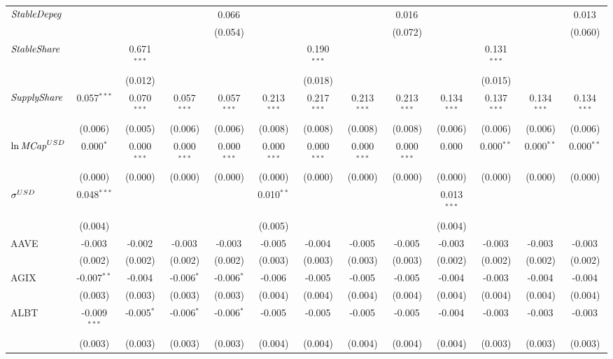 \begin{table}[!htbp]
\begin{tabular}{@{\extracolsep{5pt}}lcccccccccccc}
 ${\it StableDepeg}$ & & & & 0.066$^{}$ & & & & 0.016$^{}$ & & & & 0.013$^{}$ \\
  & & & & (0.054) & & & & (0.072) & & & & (0.060) \\
 ${\it StableShare}$ & & 0.671$^{***}$ & & & & 0.190$^{***}$ & & & & 0.131$^{***}$ & & \\
  & & (0.012) & & & & (0.018) & & & & (0.015) & & \\
 ${\it SupplyShare}$ & 0.057$^{***}$ & 0.070$^{***}$ & 0.057$^{***}$ & 0.057$^{***}$ & 0.213$^{***}$ & 0.217$^{***}$ & 0.213$^{***}$ & 0.213$^{***}$ & 0.134$^{***}$ & 0.137$^{***}$ & 0.134$^{***}$ & 0.134$^{***}$ \\
  & (0.006) & (0.005) & (0.006) & (0.006) & (0.008) & (0.008) & (0.008) & (0.008) & (0.006) & (0.006) & (0.006) & (0.006) \\
 ${\it \ln MCap}^{USD}$ & 0.000$^{*}$ & 0.000$^{***}$ & 0.000$^{***}$ & 0.000$^{***}$ & 0.000$^{***}$ & 0.000$^{***}$ & 0.000$^{***}$ & 0.000$^{***}$ & 0.000$^{}$ & 0.000$^{**}$ & 0.000$^{**}$ & 0.000$^{**}$ \\
  & (0.000) & (0.000) & (0.000) & (0.000) & (0.000) & (0.000) & (0.000) & (0.000) & (0.000) & (0.000) & (0.000) & (0.000) \\
 ${\it \sigma}^{USD}$ & 0.048$^{***}$ & & & & 0.010$^{**}$ & & & & 0.013$^{***}$ & & & \\
  & (0.004) & & & & (0.005) & & & & (0.004) & & & \\
 AAVE & -0.003$^{}$ & -0.002$^{}$ & -0.003$^{}$ & -0.003$^{}$ & -0.005$^{}$ & -0.004$^{}$ & -0.005$^{}$ & -0.005$^{}$ & -0.003$^{}$ & -0.003$^{}$ & -0.003$^{}$ & -0.003$^{}$ \\
  & (0.002) & (0.002) & (0.002) & (0.002) & (0.003) & (0.003) & (0.003) & (0.003) & (0.002) & (0.002) & (0.002) & (0.002) \\
 AGIX & -0.007$^{**}$ & -0.004$^{}$ & -0.006$^{*}$ & -0.006$^{*}$ & -0.006$^{}$ & -0.005$^{}$ & -0.005$^{}$ & -0.005$^{}$ & -0.004$^{}$ & -0.003$^{}$ & -0.004$^{}$ & -0.004$^{}$ \\
  & (0.003) & (0.003) & (0.003) & (0.003) & (0.004) & (0.004) & (0.004) & (0.004) & (0.004) & (0.004) & (0.004) & (0.004) \\
 ALBT & -0.009$^{***}$ & -0.005$^{*}$ & -0.006$^{*}$ & -0.006$^{*}$ & -0.005$^{}$ & -0.005$^{}$ & -0.005$^{}$ & -0.005$^{}$ & -0.004$^{}$ & -0.003$^{}$ & -0.003$^{}$ & -0.003$^{}$ \\
  & (0.003) & (0.003) & (0.003) & (0.003) & (0.004) & (0.004) & (0.004) & (0.004) & (0.004) & (0.003) & (0.003) & (0.003) \\

\end{tabular}
\end{table}
